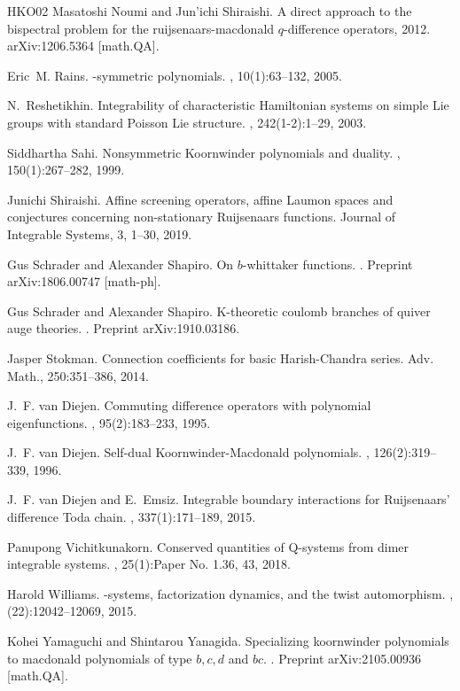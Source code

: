 \documentclass[12pt]{amsart}
\numberwithin{equation}{section}
\begin{document}
\begin{thebibliography}{HKO{\etalchar{+}}02}
Masatoshi Noumi and Jun'ichi Shiraishi.
\newblock A direct approach to the bispectral problem for the
  ruijsenaars-macdonald $q$-difference operators, 2012.
\newblock arXiv:1206.5364 [math.QA].

Eric~M. Rains.
-symmetric polynomials.
, 10(1):63--132, 2005.

N.~Reshetikhin.
\newblock Integrability of characteristic {H}amiltonian systems on simple {L}ie
  groups with standard {P}oisson {L}ie structure.
, 242(1-2):1--29, 2003.

Siddhartha Sahi.
\newblock Nonsymmetric {K}oornwinder polynomials and duality.
, 150(1):267--282, 1999.

Junichi Shiraishi.
\newblock Affine screening operators, affine Laumon spaces and conjectures concerning non-stationary Ruijsenaars functions.
\newblock Journal of Integrable Systems, 3, 1--30, 2019. 

Gus Schrader and Alexander Shapiro.
\newblock On $b$-whittaker functions.
.
\newblock Preprint arXiv:1806.00747 [math-ph].

Gus Schrader and Alexander Shapiro.
\newblock K-theoretic coulomb branches of quiver auge theories.
.
\newblock Preprint arXiv:1910.03186.

Jasper Stokman. 
\newblock Connection coefficients for basic Harish-Chandra series. 
\newblock Adv. Math., 250:351--386, 2014.

J.~F. van Diejen.
\newblock Commuting difference operators with polynomial eigenfunctions.
, 95(2):183--233, 1995.

J.~F. van Diejen.
\newblock Self-dual {K}oornwinder-{M}acdonald polynomials.
, 126(2):319--339, 1996.

J.~F. van Diejen and E.~Emsiz.
\newblock Integrable boundary interactions for {R}uijsenaars' difference {T}oda
  chain.
, 337(1):171--189, 2015.

Panupong Vichitkunakorn.
\newblock Conserved quantities of {Q}-systems from dimer integrable systems.
, 25(1):Paper No. 1.36, 43, 2018.

Harold Williams.
-systems, factorization dynamics, and the twist automorphism.
, (22):12042--12069, 2015.

Kohei Yamaguchi and Shintarou Yanagida.
\newblock Specializing koornwinder polynomials to macdonald polynomials of type
  $b,c,d$ and $bc$.
.
\newblock Preprint arXiv:2105.00936 [math.QA].

\end{thebibliography}


%

%
\end{document}
